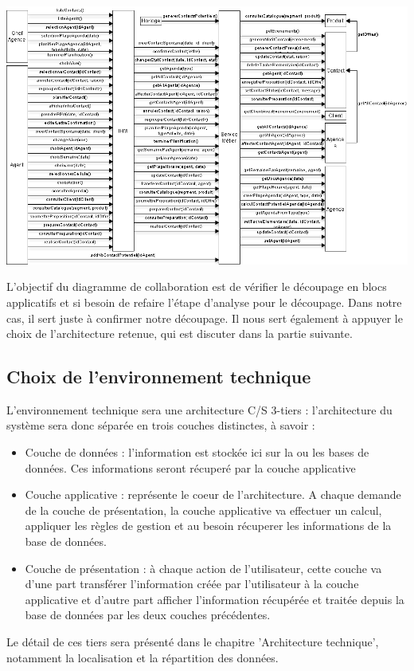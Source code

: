 \begin {center}
\includegraphics[width=\textwidth]{diagramme-collaboration.png}
\end {center}

L'objectif du diagramme de collaboration est de vérifier le découpage en blocs applicatifs et si besoin de refaire l'étape d'analyse pour le découpage. Dans notre cas, il sert juste à confirmer notre découpage. Il nous sert également à appuyer le choix de l'architecture retenue, qui est discuter dans la partie suivante.


\subsection{Choix de l'environnement technique}
L'environnement technique sera une architecture C/S 3-tiers : l'architecture du système sera donc séparée en trois couches distinctes, à savoir :
\begin{itemize}
\item Couche de données : l'information est stockée ici sur la ou les bases de données. Ces informations seront récuperé par la couche applicative
\item Couche applicative : représente le coeur de l'architecture. A chaque demande de la couche de présentation, la couche applicative va effectuer un calcul, appliquer les règles de gestion et au besoin récuperer les informations de la base de données.
\item Couche de présentation : à chaque action de l'utilisateur, cette couche va d'une part transférer l'information créée par l'utilisateur à la couche applicative et d'autre part afficher l'information récupérée et traitée depuis la base de données par les deux couches précédentes.
\end{itemize}
Le détail de ces tiers sera présenté dans le chapitre 'Architecture technique', notamment la localisation et la répartition des données.
